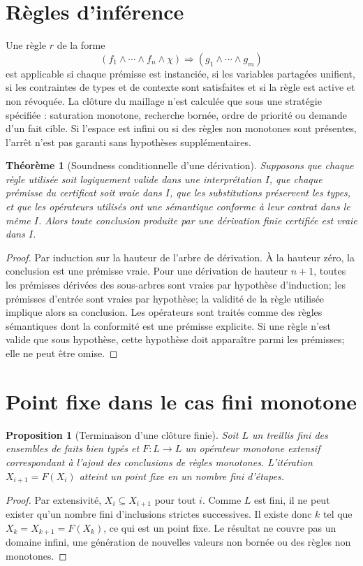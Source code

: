 \documentclass[11pt,a4paper,openany]{book}
\theoremstyle{definition}
\theoremstyle{plain}
\newtheorem{theorem}[definition]{Théorème}
\newtheorem{proposition}[definition]{Proposition}
\theoremstyle{remark}
\begin{document}
\section{Règles d'inférence}
Une règle $r$ de la forme
\[
(f_1\land\cdots\land f_n\land\chi)\Rightarrow(g_1\land\cdots\land g_m)
\]
est applicable si chaque prémisse est instanciée, si les variables partagées unifient, si les contraintes de types et de contexte sont satisfaites et si la règle est active et non révoquée. La clôture du maillage n'est calculée que sous une stratégie spécifiée : saturation monotone, recherche bornée, ordre de priorité ou demande d'un fait cible. Si l'espace est infini ou si des règles non monotones sont présentes, l'arrêt n'est pas garanti sans hypothèses supplémentaires.

\begin{theorem}[Soundness conditionnelle d'une dérivation]
Supposons que chaque règle utilisée soit logiquement valide dans une interprétation $I$, que chaque prémisse du certificat soit vraie dans $I$, que les substitutions préservent les types, et que les opérateurs utilisés ont une sémantique conforme à leur contrat dans le même $I$. Alors toute conclusion produite par une dérivation finie certifiée est vraie dans $I$.
\end{theorem}
\begin{proof}
Par induction sur la hauteur de l'arbre de dérivation. À la hauteur zéro, la conclusion est une prémisse vraie. Pour une dérivation de hauteur $n+1$, toutes les prémisses dérivées des sous-arbres sont vraies par hypothèse d'induction; les prémisses d'entrée sont vraies par hypothèse; la validité de la règle utilisée implique alors sa conclusion. Les opérateurs sont traités comme des règles sémantiques dont la conformité est une prémisse explicite. Si une règle n'est valide que sous hypothèse, cette hypothèse doit apparaître parmi les prémisses; elle ne peut être omise.
\end{proof}

\section{Point fixe dans le cas fini monotone}
\begin{proposition}[Terminaison d'une clôture finie]
Soit $L$ un treillis fini des ensembles de faits bien typés et $F:L\to L$ un opérateur monotone extensif correspondant à l'ajout des conclusions de règles monotones. L'itération $X_{i+1}=F(X_i)$ atteint un point fixe en un nombre fini d'étapes.
\end{proposition}
\begin{proof}
Par extensivité, $X_i\subseteq X_{i+1}$ pour tout $i$. Comme $L$ est fini, il ne peut exister qu'un nombre fini d'inclusions strictes successives. Il existe donc $k$ tel que $X_k=X_{k+1}=F(X_k)$, ce qui est un point fixe. Le résultat ne couvre pas un domaine infini, une génération de nouvelles valeurs non bornée ou des règles non monotones.
\end{proof}
\end{document}
